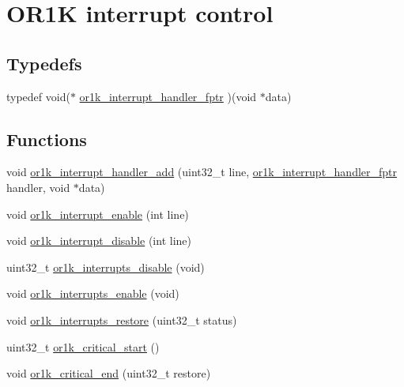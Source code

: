 \hypertarget{group__or1k__interrupts}{\section{O\-R1\-K interrupt control}
\label{group__or1k__interrupts}
}
\subsection*{Typedefs}
\begin{DoxyCompactItemize}
\item 
typedef void($\ast$ \hyperlink{group__or1k__interrupts_ga7f64e8553d4a6a80a70c9d7626d8469f}{or1k\-\_\-interrupt\-\_\-handler\-\_\-fptr} )(void $\ast$data)
\end{DoxyCompactItemize}
\subsection*{Functions}
\begin{DoxyCompactItemize}
\item 
void \hyperlink{group__or1k__interrupts_gae8d1315878d7641cf6840d16a73e94a5}{or1k\-\_\-interrupt\-\_\-handler\-\_\-add} (uint32\-\_\-t line, \hyperlink{group__or1k__interrupts_ga7f64e8553d4a6a80a70c9d7626d8469f}{or1k\-\_\-interrupt\-\_\-handler\-\_\-fptr} handler, void $\ast$data)
\item 
void \hyperlink{group__or1k__interrupts_gace2e505048c2d8a77521e4bf5bc03967}{or1k\-\_\-interrupt\-\_\-enable} (int line)
\item 
void \hyperlink{group__or1k__interrupts_ga0f0f3a574dde52175eabace4aaaec34a}{or1k\-\_\-interrupt\-\_\-disable} (int line)
\item 
uint32\-\_\-t \hyperlink{group__or1k__interrupts_ga6596faf65911ecbcc9881937971946f3}{or1k\-\_\-interrupts\-\_\-disable} (void)
\item 
void \hyperlink{group__or1k__interrupts_ga344fd4bd73d40748de810eda21f0f47c}{or1k\-\_\-interrupts\-\_\-enable} (void)
\item 
void \hyperlink{group__or1k__interrupts_ga678519bbf7a7fe2efe99f1b4c7a8da18}{or1k\-\_\-interrupts\-\_\-restore} (uint32\-\_\-t status)
\item 
uint32\-\_\-t \hyperlink{group__or1k__interrupts_ga2bf6620d852e42c7a04aa791ea32557f}{or1k\-\_\-critical\-\_\-start} ()
\item 
void \hyperlink{group__or1k__interrupts_ga470956270188c5ebf719a2cc499c82b7}{or1k\-\_\-critical\-\_\-end} (uint32\-\_\-t restore)
\end{DoxyCompactItemize}


